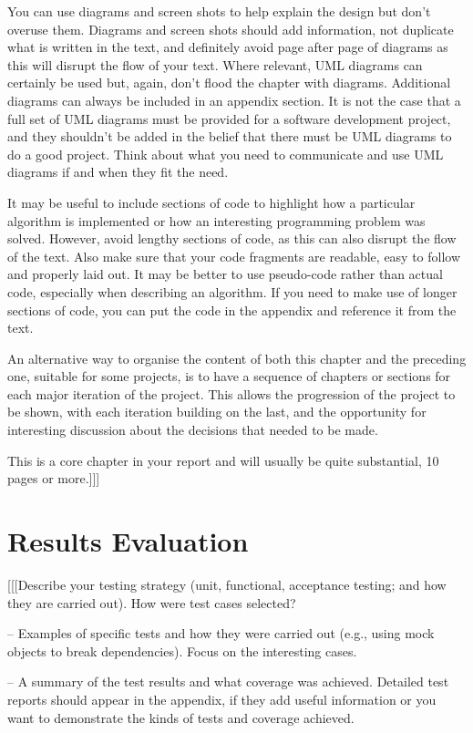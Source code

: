 \documentclass{report}
\begin{document}
You can use diagrams and screen shots to help explain the design but don’t overuse them. Diagrams and screen shots should add information, not duplicate what is written in the text, and definitely avoid page after page of diagrams as this will disrupt the flow of your text. Where relevant, UML diagrams can certainly be used but, again, don’t flood the chapter with diagrams. Additional diagrams can always be included in an appendix section. It is not the case that a full set of UML diagrams must be provided for a software development project, and they shouldn’t be added in the belief that there must be UML diagrams to do a good project. Think about what you need to communicate and use UML diagrams if and when they fit the need.

It may be useful to include sections of code to highlight how a particular algorithm is implemented or how an interesting programming problem was solved. However, avoid lengthy sections of code, as this can also disrupt the flow of the text. Also make sure that your code fragments are readable, easy to follow and properly laid out. It may be better to use pseudo-code rather than actual code, especially when describing an algorithm. If you need to make use of longer sections of code, you can put the code in the appendix and reference it from the text.

An alternative way to organise the content of both this chapter and the preceding one, suitable for some projects, is to have a sequence of chapters or sections for each major iteration of the project. This allows the progression of the project to be shown, with each iteration building on the last, and the opportunity for interesting discussion about the decisions that needed to be made.

This is a core chapter in your report and will usually be quite substantial, 10 pages or more.]]]


\chapter{Results Evaluation}

[[[Describe your testing strategy (unit, functional, acceptance testing; and how they are carried out). How were test cases selected?

– Examples of specific tests and how they were carried out (e.g., using mock objects to break dependencies). Focus on the interesting cases.

– A summary of the test results and what coverage was achieved. Detailed test reports should appear in the appendix, if they add useful information or you want to demonstrate the kinds of tests and coverage achieved.
\end{document}

